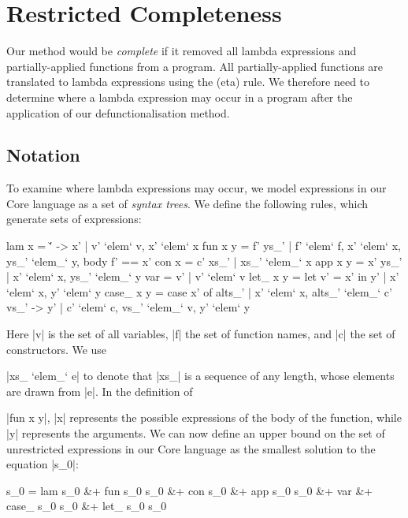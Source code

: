 \section{Restricted Completeness}
\label{secF:completeness}


Our method would be \textit{complete} if it removed all lambda expressions and partially-applied functions from a program. All partially-applied functions are translated to lambda expressions using the (eta) rule. We therefore need to determine where a lambda expression may occur in a program after the application of our defunctionalisation method.

\subsection{Notation}

To examine where lambda expressions may occur, we model expressions in our Core language as a set of \textit{syntax trees}. We define the following rules, which generate sets of expressions:

\ignore\begin{code}
lam x      = {\v' -> x' | v' `elem` v, x' `elem` x}
fun x y    = {f' ys_' | f' `elem` f, x' `elem` x, ys_' `elem_` y, body f' == x'}
con x      = {c' xs_' | xs_' `elem_` x}
app x y    = {x' ys_' | x' `elem` x, ys_' `elem_` y}
var        = {v' | v' `elem` v}
let_ x y   = {let v' = x' in y' | x' `elem` x, y' `elem` y}
case_ x y  = {case  x' of alts_' | x' `elem` x,
                    alts_' `elem_` {c' vs_' -> y' | c' `elem` c, vs_' `elem_` v, y' `elem` y}}
\end{code}

Here |v| is the set of all variables, |f| the set of function names, and |c| the set of constructors. We use \ignore|xs_ `elem_` e| to denote that |xs_| is a sequence of any length, whose elements are drawn from |e|. In the definition of \ignore|fun x y|, |x| represents the possible expressions of the body of the function, while |y| represents the arguments. We can now define an upper bound on the set of unrestricted expressions in our Core language as the smallest solution to the equation |s_0|:

\ignore\begin{code}
s_0  =  lam s_0 &+ fun s_0 s_0 &+ con s_0 &+ app s_0 s_0 &+ var &+
        case_ s_0 s_0 &+ let_ s_0 s_0
\end{code}

